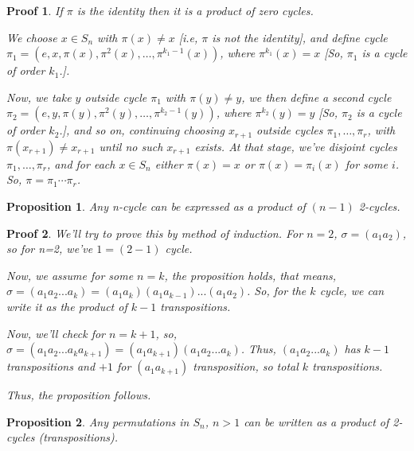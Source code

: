 \documentclass[12pt,a4paper]{article}
\theoremstyle{custom}
\newtheorem*{proposition}{Proposition}
\newtheorem*{proofcustom}{Proof}
\begin{document}
\begin{proofcustom}
    If $\pi$ is the identity then it is a product of zero cycles.

We choose $x \in S_n$ with $\pi\left(x\right) \neq x$ [i.e, $\pi$ is not the identity], and define cycle $\pi_{1}=\left(e, x, \pi\left(x\right), \pi^{2}\left(x\right), \ldots, \pi^{k_{1}-1}\left(x\right)\right)$, where $\pi^{k_{1}}\left(x\right)=x$ [So, $\pi_1$ is a cycle of order $k_1$.].

Now, we take $y$ outside cycle $\pi_{1}$ with $\pi\left(y\right) \neq y$, we then define a second cycle $\pi_{2}=\left(e, y, \pi\left(y\right), \pi^{2}\left(y\right), \ldots, \pi^{k_{2}-1}\left(y\right)\right)$, where $\pi^{k_{2}}\left(y\right)=y$ [So, $\pi_2$ is a cycle of order $k_2$.], and so on, continuing choosing $x_{r+1}$ outside cycles $\pi_{1}, \ldots, \pi_{r}$, with $\pi\left(x_{r+1}\right) \neq x_{r+1}$ until no such $x_{r+1}$ exists. At that stage, we've disjoint cycles $\pi_{1}, \ldots, \pi_{r}$, and for each $x \in S_n$ either $\pi(x)=x$ or $\pi(x)=\pi_{i}(x)$ for some $i$. So, $\pi=\pi_{1} \cdots \pi_{r}$.
\end{proofcustom}

\begin{proposition}
    Any n-cycle can be expressed as a product of $(n - 1)$ 2-cycles.
\end{proposition}

\begin{proofcustom}
    We'll try to prove this by method of induction. 
    For $n=2$, $\sigma= (a_1a_2)$, so for n=2, we've $ 1= (2-1)$ cycle.

    Now, we assume for some $n=k$, the proposition holds, that means, 
    $\sigma=(a_1a_2...a_k)=(a_1a_k)(a_1a_{k-1})...(a_1a_2)$. So, for the $k$ cycle, we can write it as the product of  $k-1$ transpositions. 

    Now, we'll check for $n=k+1$, so, $\sigma=(a_1a_2...a_ka_{k+1})= (a_1a_{k+1})(a_1a_2...a_k)$. Thus, $(a_1a_2...a_k)$ has $k-1$ transpositions and $+1$ for $(a_1a_{k+1})$ transposition, so total $k$ transpositions.

    Thus, the proposition follows. 


\end{proofcustom}
\newpage
\begin{proposition}
    Any permutations in $S_n$, $n>1$ can be written as a product of 2-cycles (transpositions).
\end{proposition}
\end{document}
